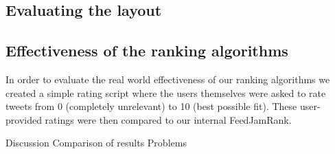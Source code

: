 \subsection{Evaluating the layout}

\subsection{Effectiveness of the ranking algorithms}
In order to evaluate the real world effectiveness of our ranking algorithms we created a simple rating script where the users themselves were asked to rate tweets from 0 (completely unrelevant) to 10 (best possible fit). These user-provided ratings were then compared to our internal FeedJamRank.

Discussion
Comparison of results
Problems